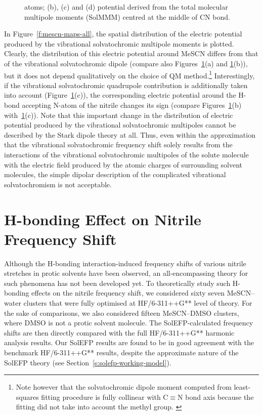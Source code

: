 \documentclass[a4paper,titlepage,twoside,fleqn,12pt]{book}
\begin{document}
\begin{refsection}
\begin{figure}[t!]
{atoms; (b), (c) and (d) potential derived from the total molecular multipole moments (SolMMM) centred at the middle
of CN bond.
\label{f:mescn-maps}}
\end{figure}
%
In Figure~\ref{f:mescn-maps-all}, the spatial distribution of the electric
potential produced by the vibrational solvatochromic
multipole moments is plotted. Clearly, the distribution of this
electric potential around MeSCN differs from that of the
vibrational solvatochromic dipole (compare also Figures~\ref{f:mescn-maps}(a)
and \ref{f:mescn-maps}(b)), but it does not depend qualitatively
on the choice of QM method.\footnote{Note however
that the solvatochromic dipole moment
computed from least\hyp{}squares fitting procedure
is fully collinear with C$\equiv$N bond axis
because the fitting did not take into account the
methyl group. \citep{Lee.Choi.Cho.JCP.2012}} 
%
Interestingly, if
the vibrational solvatochromic quadrupole contribution is
additionally taken into account (Figure~\ref{f:mescn-maps}(c)), the corresponding
electric potential around the H-bond accepting N-atom of the
nitrile changes its sign (compare Figures~\ref{f:mescn-maps}(b) with~\ref{f:mescn-maps}(c)). Note
that this important change in the distribution of electric
potential produced by the vibrational solvatochromic
multipoles cannot be described by the Stark dipole theory at
all. Thus, even within the approximation that the vibrational
solvatochromic frequency shift solely results from the
interactions of the vibrational solvatochromic multipoles of
the solute molecule with the electric field produced by the
atomic charges of surrounding solvent molecules, the simple
dipolar description of the complicated vibrational
solvatochromism is not acceptable.

\section{H-bonding Effect on Nitrile Frequency Shift}

Although the H-bonding interaction\hyp{}induced frequency shifts
of various nitrile stretches in protic solvents have been
observed, an all\hyp{}encompassing theory for such phenomena has
not been developed yet. To theoretically study such H-bonding
effects on the nitrile frequency shift, we considered sixty seven
MeSCN--water clusters that were fully optimised at HF/6-311++G** 
level of theory. For the sake of comparisons, we
also considered fifteen MeSCN--DMSO clusters, where DMSO is
not a protic solvent molecule. The SolEFP\hyp{}calculated frequency
shifts are then directly compared with the full HF/6-311++G**
harmonic analysis results. Our SolEFP results are found to be in
good agreement with the benchmark HF/6-311++G** results,
despite the approximate nature of the SolEFP theory (see
Section~\ref{s:solefp-working-model}).


\end{refsection}
\end{document}
